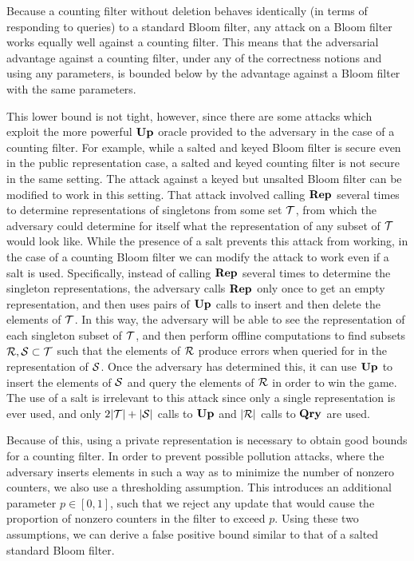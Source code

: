 Because a counting filter without deletion behaves identically (in terms of
responding to queries) to a standard Bloom filter, any attack on a Bloom filter
works equally well against a counting filter. This means that the adversarial
advantage against a counting filter, under any of the correctness notions and
using any parameters, is bounded below by the advantage against a Bloom filter
with the same parameters.

This lower bound is not tight, however, since there are some attacks which
exploit the more powerful $\textup{\textbf{Up}}\hspace{0.5pt}$ oracle provided to the adversary in the case of
a counting filter. For example, while a salted and keyed Bloom filter is secure even in the public representation case, a salted and keyed counting filter is not secure in the same setting. The attack against a keyed but unsalted Bloom filter can be modified to work in this setting. That attack involved calling $\textup{\textbf{Rep}}\hspace{0.5pt}$ several times to determine representations of singletons from some set $\mathcal{T}$, from which the adversary could determine for itself what the representation of any subset of $\mathcal{T}$ would look like. While the presence of a salt prevents this attack from working, in the case of a counting Bloom filter we can modify the attack to work even if a salt is used. Specifically, instead of calling $\textup{\textbf{Rep}}\hspace{0.5pt}$ several times to determine the singleton representations, the adversary calls $\textup{\textbf{Rep}}\hspace{0.5pt}$ only once to get an empty representation, and then uses pairs of $\textup{\textbf{Up}}\hspace{0.5pt}$ calls to insert and then delete the elements of $\mathcal{T}$. In this way, the adversary will be able to see the representation of each singleton subset of $\mathcal{T}$, and then perform offline computations to find subsets $\mathcal{R}, \mathcal{S} \subset \mathcal{T}$ such that the elements of $\mathcal{R}$ produce errors when queried for in the representation of $\mathcal{S}$. Once the adversary has determined this, it can use $\textup{\textbf{Up}}\hspace{0.5pt}$ to insert the elements of $\mathcal{S}$ and query the elements of $\mathcal{R}$ in order to win the game. The use of a salt is irrelevant to this attack since only a single representation is ever used, and only $2|\mathcal{T}|+|\mathcal{S}|$ calls to $\textup{\textbf{Up}}\hspace{0.5pt}$ and $|\mathcal{R}|$ calls to $\textup{\textbf{Qry}}\hspace{0.5pt}$ are used.

Because of this, using a private representation is necessary to obtain good bounds for a counting filter. In order to prevent possible pollution attacks, where the adversary inserts elements in such a way as to minimize the number of nonzero counters, we also use a thresholding assumption. This introduces an additional parameter $p \in [0,1]$, such that we reject any update that would cause the proportion of nonzero counters in the filter to exceed $p$. Using these two assumptions, we can derive a
false positive bound similar to that of a salted standard Bloom filter.

